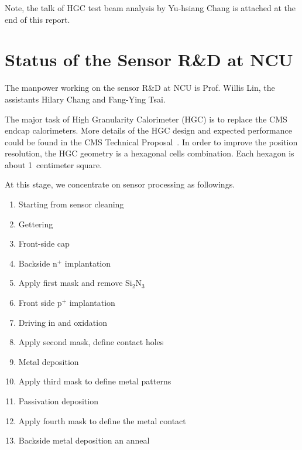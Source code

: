 
\maketitle %
Note, the talk of HGC test beam analysis by Yu-hsiang Chang is attached at the end of this report.

\section{Status of the Sensor R\&D at NCU}
The manpower working on the sensor R\&D at NCU is Prof. Willis Lin, the 
assistants Hilary Chang and Fang-Ying Tsai. 

The major task of High Granularity Calorimeter (HGC) is to replace the 
CMS endcap calorimeters. More details of the HGC design and expected 
performance could be found in the CMS Technical Proposal~\cite{HGC-TDR}. 
In order to improve the position resolution, the HGC geometry is a hexagonal 
cells combination. Each hexagon is about 1~centimeter square. 

At this stage, we concentrate on sensor processing as followings.
\begin{enumerate}
\item Starting from sensor cleaning
\item Gettering
\item Front-side cap
\item Backside n$^{+}$ implantation
\item Apply first mask and remove Si$_2$N$_3$
\item Front side p$^{+}$ implantation
\item Driving in and oxidation
\item Apply second mask, define contact holes
\item Metal deposition
\item Apply third mask to define metal patterns
\item Passivation deposition
\item Apply fourth mask to define the metal contact
\item Backside metal deposition an anneal
\end{enumerate}

